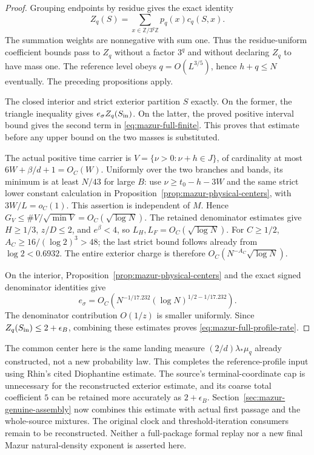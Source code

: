\documentclass[11pt]{article}
\theoremstyle{remark}\newtheorem{remark}[proposition]{Remark}
\begin{document}
\begin{proof}
Grouping endpoints by residue gives the exact identity
\[
 Z_q(S)=\sum_{x\in\mathbb Z/3^q\mathbb Z}p_q(x)c_q(S,x).
\]
The summation weights are nonnegative with sum one. Thus the
residue-uniform coefficient bounds pass to $Z_q$ without a factor
$3^q$ and without declaring $Z_q$ to have mass one.
The reference level obeys $q=O(L^{3/5})$, hence $h+q\le N$
eventually. The preceding propositions apply.

The closed interior and strict exterior partition $S$ exactly.
On the former, the triangle inequality gives $e_\sigma Z_q(S_{\rm in})$.
On the latter, the proved positive interval bound gives the second
term in \eqref{eq:mazur-full-finite}. This proves that estimate
before any upper bound on the two masses is substituted.

The actual positive time carrier is
$V=\{\nu>0:\nu+h\in J\}$, of cardinality at most
$6W+\beta/d+1=O_C(W)$.
Uniformly over the two branches and bands, its minimum is at least
$N/43$ for large $B$: use
$\nu\ge t_0-h-3W$ and the same strict lower constant calculation
in Proposition~\ref{prop:mazur-physical-centers}, with $3W/L=o_C(1)$.
This assertion is independent of $M$.
Hence $G_V\le\#V/\sqrt{\min V}=O_C(\sqrt{\log N})$.
The retained denominator estimates give $H\ge1/3$, $z/D\le2$,
and $e^\beta<4$, so $L_H,L_F=O_C(\sqrt{\log N})$.
For $C\ge1/2$, $A_C\ge16/(\log2)^3>48$; the last strict bound
follows already from $\log2<0.6932$.
The entire exterior charge is therefore
$O_C(N^{-A_C}\sqrt{\log N})$.

On the interior, Proposition~\ref{prop:mazur-physical-centers} and
the exact signed denominator identities give
\[
 e_\sigma=O_C\!\left(N^{-1/17.232}
              (\log N)^{1/2-1/17.232}\right).
\]
The denominator contribution $O(1/z)$ is smaller uniformly.
Since $Z_q(S_{\rm in})\le2+\epsilon_B$, combining these estimates
proves \eqref{eq:mazur-full-profile-rate}.
\end{proof}

The common center here is the same landing measure
$(2/d)\lambda_*\mu_q$ already constructed, not a new probability law.
This completes the reference-profile input using Rhin's cited
Diophantine estimate. The source's terminal-coordinate cap is unnecessary
for the reconstructed exterior estimate, and its coarse total coefficient
$5$ can be retained more accurately as $2+\epsilon_B$.
Section~\ref{sec:mazur-genuine-assembly} now combines this estimate
with actual first passage and the whole-source mixtures. The original
clock and threshold-iteration consumers remain to be reconstructed.
Neither a full-package formal replay nor a new final Mazur
natural-density exponent is asserted here.
\end{document}
